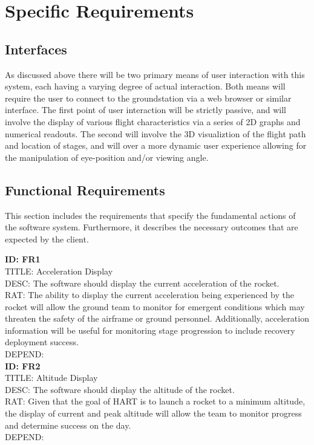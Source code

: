 \documentclass[onecolumn, draftclsnofoot,10pt, compsoc]{IEEEtran}
\begin{document}
	\newpage
	\section{Specific Requirements}
		\subsection{Interfaces}
			As discussed above there will be two primary means of user interaction with this system, each having a varying degree of actual interaction.
			Both means will require the user to connect to the groundstation via a web browser or similar interface.
			The first point of user interaction will be strictly passive, and will involve the display of various flight characteristics via a series of 2D graphs and numerical readouts.
			The second will involve the 3D visualiztion of the flight path and location of stages, and will over a more dynamic user experience allowing for the manipulation of eye-position and/or viewing angle.

		\subsection{Functional Requirements}
			This section includes the requirements that specify the fundamental actions of the software system. Furthermore, it describes the necessary outcomes that are expected by the client.

			\noindent
			\textbf{ID: FR1}\\
			TITLE: Acceleration Display\\
			DESC: The software should display the current acceleration of the rocket.\\
			RAT: The ability to display the current acceleration being experienced by the rocket will allow the ground team to monitor for emergent conditions which may threaten the safety of the airframe or ground personnel.
				Additionally, acceleration information will be useful for monitoring stage progression to include recovery deployment success.\\
			DEPEND: \\
			
			\noindent
			\textbf{ID: FR2}\\
			TITLE: Altitude Display\\
			DESC: The software should display the altitude of the rocket.\\
			RAT: Given that the goal of HART is to launch a rocket to a minimum altitude, the display of current and peak altitude will allow the team to monitor progress and determine success on the day.\\
			DEPEND: \\ 
			
\end{document}
